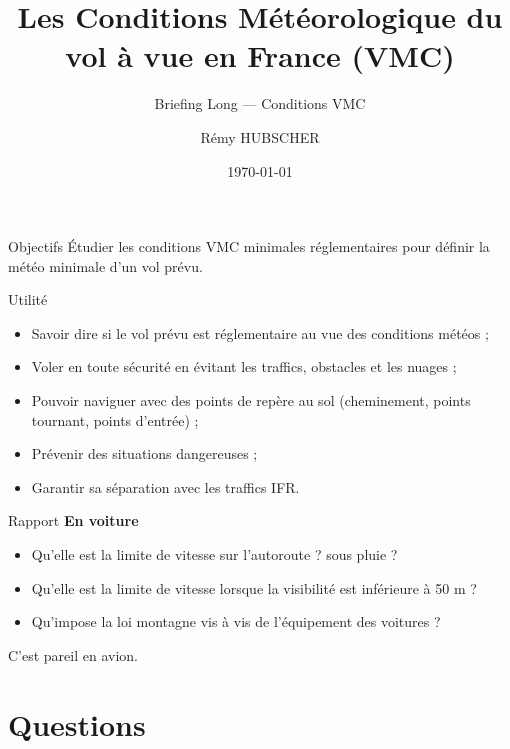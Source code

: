 \documentclass{beamer}
\author{Rémy HUBSCHER}
\begin{document}
  \title[Briefing Long — Conditions VMC]{Les Conditions Météorologique du vol à vue en France (VMC)}
  \subtitle{Briefing Long — Conditions VMC}
\date{\today} 

\begin{frame}[plain]
  \titlepage
\end{frame}

\begin{frame}{Objectifs}
  Étudier les conditions VMC minimales réglementaires pour définir la
  météo minimale d'un vol prévu.
\end{frame}

\begin{frame}{Utilité}
  \begin{itemize} 
    \item Savoir dire si le vol prévu est réglementaire au vue des conditions météos ; \pause
    \item Voler en toute sécurité en évitant les traffics, obstacles et les nuages ; \pause
    \item Pouvoir naviguer avec des points de repère au sol (cheminement, points tournant, points d'entrée) ; \pause
    \item Prévenir des situations dangereuses ; \pause
    \item Garantir sa séparation avec les traffics IFR.
  \end{itemize}  
\end{frame}

\begin{frame}{Rapport}
  \textbf{En voiture}
  
  \begin{itemize}
    \item Qu'elle est la limite de vitesse sur l'autoroute ? \pause sous pluie ? \pause
    \item Qu'elle est la limite de vitesse lorsque la visibilité est inférieure à 50 m ? \pause
    \item Qu'impose la loi montagne vis à vis de l'équipement des voitures ? \pause
  \end{itemize}

  \vspace*{1em}
  \pause
  
  \vspace*{1em}
  C'est pareil en avion.
\end{frame}

\section{Questions}
\end{document}
